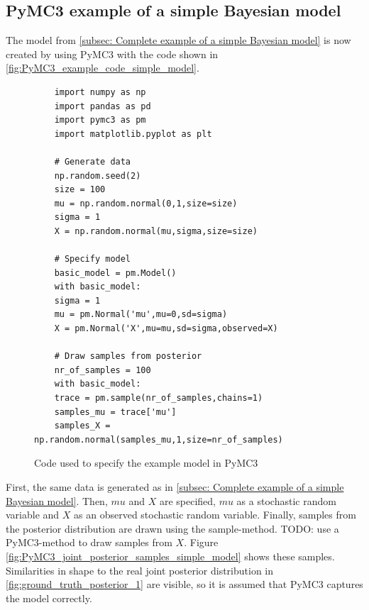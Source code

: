 \documentclass{article}
\begin{document}
\subsection{PyMC3 example of a simple Bayesian model}
\label{subsec: PyMC3 example of a simple Bayesian model}
The model from \autoref{subsec: Complete example of a simple Bayesian model} is now created by using PyMC3 with the code shown in \autoref{fig:PyMC3_example_code_simple_model}.
\begin{figure}[h]
	\begin{lstlisting}
	import numpy as np
	import pandas as pd
	import pymc3 as pm
	import matplotlib.pyplot as plt
	
	# Generate data
	np.random.seed(2)
	size = 100
	mu = np.random.normal(0,1,size=size)
	sigma = 1
	X = np.random.normal(mu,sigma,size=size)
	
	# Specify model
	basic_model = pm.Model()
	with basic_model:
	sigma = 1
	mu = pm.Normal('mu',mu=0,sd=sigma)
	X = pm.Normal('X',mu=mu,sd=sigma,observed=X)
	
	# Draw samples from posterior
	nr_of_samples = 100
	with basic_model:
	trace = pm.sample(nr_of_samples,chains=1)
	samples_mu = trace['mu']
	samples_X = np.random.normal(samples_mu,1,size=nr_of_samples)
	\end{lstlisting}
	\caption[Code used to specify the example model in PyMC3]{Code used to specify the example model in PyMC3}
	\label{fig:PyMC3_example_code_simple_model}
\end{figure}
First, the same data is generated as in \autoref{subsec: Complete example of a simple Bayesian model}. Then, $mu$ and $X$ are specified, $mu$ as a stochastic random variable and $X$ as an observed stochastic random variable. Finally, samples from the posterior distribution are drawn using the sample-method. TODO: use a PyMC3-method to draw samples from $X$.
Figure \ref{fig:PyMC3_joint_posterior_samples_simple_model} shows these samples. Similarities in shape to the real joint posterior distribution in \autoref{fig:ground_truth_posterior_1} are visible, so it is assumed that PyMC3 captures the model correctly.
\end{document}
